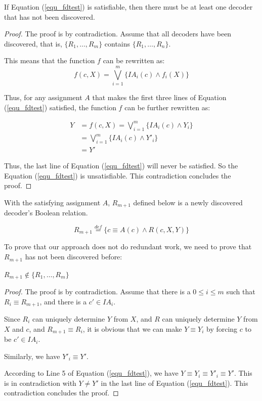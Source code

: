 \documentclass[journal]{IEEEtran}
\begin{document}
\begin{theorem}[]\label{thm_fdok1}
If Equation (\ref{equ_fdtest}) is satisfiable,
then there must be at least one decoder that has not been discovered.
\end{theorem}
\begin{proof}
The proof is by contradiction.
Assume that all decoders have been discovered,
that is,
$\{R_1,\dots,R_{m}\}$ contains $\{R_1,\dots,R_{n}\}$.

This means that the function $f$ can be rewritten as:
\begin{equation}\label{equ_fdfrewagain1}
f(c,X)=\bigvee _{i=1}^{m} \{IA_i(c)\wedge f_i(X)\}
\end{equation}

Thus,
for any assignment $A$ that makes the first three lines of Equation (\ref{equ_fdtest}) satisfied,
the function $f$ can be further rewritten as:

\begin{equation}\label{equ_fdfrewagain2}
\begin{split}
Y&=f(c,X)=\bigvee _{i=1}^{m} \{IA_i(c)\wedge Y_i\}\\
 &=\bigvee _{i=1}^{m} \{IA_i(c)\wedge Y'_i\}\\
 &=Y'
\end{split}
\end{equation}

Thus,
the last line of Equation (\ref{equ_fdtest}) will never be satisfied.
So the Equation (\ref{equ_fdtest}) is unsatisfiable.
This contradiction concludes the proof.
\end{proof}

With the satisfying assignment $A$,
$R_{m+1}$ defined below is a newly discovered decoder's Boolean relation.

\begin{equation}\label{equ_newR}
R_{m+1}\stackrel{def}{=}\{c\equiv A(c)\wedge R(c,X,Y)\}
\end{equation}

To prove that our approach does not do redundant work,
we need to prove that $R_{m+1}$ has not been discovered before:

\begin{theorem}[]\label{thm_new1}
$R_{m+1}\notin \{R_1,\dots,R_m\}$
\end{theorem}
\begin{proof}
The proof is by contradiction.
Assume that there is a $0\le i\le m$ such that $R_i\equiv R_{m+1}$,
and there is a $c'\in IA_i$.

Since $R_i$ can uniquely determine $Y$ from $X$,
and $R$ can uniquely determine $Y$ from $X$ and $c$,
and  $R_{m+1}\equiv R_i$,
it is obvious that we can make $Y\equiv Y_i$ by forcing $c$ to be $c'\in IA_i$.

Similarly,
we have $Y'_i\equiv Y'$.

According to Line 5 of Equation (\ref{equ_fdtest}),
we have $Y\equiv Y_i\equiv Y'_i\equiv Y'$.
This is in contradiction with $Y\ne Y'$ in the last line of Equation (\ref{equ_fdtest}).
This contradiction concludes the proof.
\end{proof}
\end{document}
